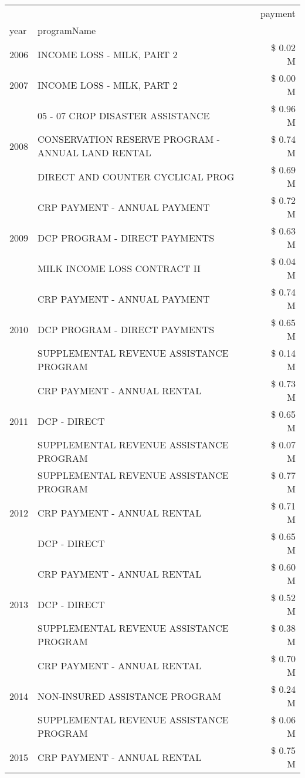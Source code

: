 \begin{tabular}{llr}
\toprule
 &  & payment \\
year & programName &  \\
\midrule
2006 & INCOME LOSS - MILK, PART 2 & \$ 0.02 M \\
\cline{1-3}
2007 & INCOME LOSS - MILK, PART 2 & \$ 0.00 M \\
\cline{1-3}
\multirow[t]{3}{*}{2008} & 05 - 07 CROP DISASTER ASSISTANCE & \$ 0.96 M \\
 & CONSERVATION RESERVE PROGRAM - ANNUAL LAND RENTAL & \$ 0.74 M \\
 & DIRECT AND COUNTER CYCLICAL PROG & \$ 0.69 M \\
\cline{1-3}
\multirow[t]{3}{*}{2009} & CRP PAYMENT - ANNUAL PAYMENT & \$ 0.72 M \\
 & DCP PROGRAM - DIRECT PAYMENTS & \$ 0.63 M \\
 & MILK INCOME LOSS CONTRACT II & \$ 0.04 M \\
\cline{1-3}
\multirow[t]{3}{*}{2010} & CRP PAYMENT - ANNUAL PAYMENT & \$ 0.74 M \\
 & DCP PROGRAM - DIRECT PAYMENTS & \$ 0.65 M \\
 & SUPPLEMENTAL REVENUE ASSISTANCE PROGRAM & \$ 0.14 M \\
\cline{1-3}
\multirow[t]{3}{*}{2011} & CRP PAYMENT - ANNUAL RENTAL & \$ 0.73 M \\
 & DCP - DIRECT & \$ 0.65 M \\
 & SUPPLEMENTAL REVENUE ASSISTANCE PROGRAM & \$ 0.07 M \\
\cline{1-3}
\multirow[t]{3}{*}{2012} & SUPPLEMENTAL REVENUE ASSISTANCE PROGRAM & \$ 0.77 M \\
 & CRP PAYMENT - ANNUAL RENTAL & \$ 0.71 M \\
 & DCP - DIRECT & \$ 0.65 M \\
\cline{1-3}
\multirow[t]{3}{*}{2013} & CRP PAYMENT - ANNUAL RENTAL & \$ 0.60 M \\
 & DCP - DIRECT & \$ 0.52 M \\
 & SUPPLEMENTAL REVENUE ASSISTANCE PROGRAM & \$ 0.38 M \\
\cline{1-3}
\multirow[t]{3}{*}{2014} & CRP PAYMENT - ANNUAL RENTAL & \$ 0.70 M \\
 & NON-INSURED ASSISTANCE PROGRAM & \$ 0.24 M \\
 & SUPPLEMENTAL REVENUE ASSISTANCE PROGRAM & \$ 0.06 M \\
\cline{1-3}
\multirow[t]{2}{*}{2015} & CRP PAYMENT - ANNUAL RENTAL & \$ 0.75 M \\

\end{tabular}
